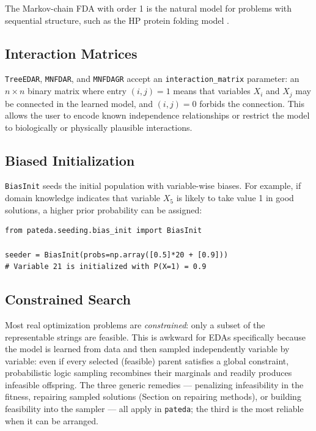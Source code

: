 \documentclass[a4paper,11pt]{article}
\begin{document}
The Markov-chain FDA with order 1 is the natural model for problems with
sequential structure, such as the HP protein folding model
\citep{Dill:1985,Santana_et_al:2004}.

\subsection{Interaction Matrices}

\texttt{TreeEDAR}, \texttt{MNFDAR}, and \texttt{MNFDAGR} accept an
\texttt{interaction\_matrix} parameter: an $n \times n$ binary matrix where
entry $(i,j)=1$ means that variables $X_i$ and $X_j$ may be connected in
the learned model, and $(i,j)=0$ forbids the connection.  This allows the
user to encode known independence relationships or restrict the model to
biologically or physically plausible interactions.

\subsection{Biased Initialization}

\texttt{BiasInit} seeds the initial population with variable-wise biases.
For example, if domain knowledge indicates that variable $X_5$ is likely to
take value 1 in good solutions, a higher prior probability can be assigned:

\begin{lstlisting}
from pateda.seeding.bias_init import BiasInit

seeder = BiasInit(probs=np.array([0.5]*20 + [0.9]))
# Variable 21 is initialized with P(X=1) = 0.9
\end{lstlisting}

\subsection{Constrained Search}

Most real optimization problems are \emph{constrained}: only a subset of the
representable strings are feasible. This is awkward for EDAs specifically because
the model is learned from data and then sampled independently variable by
variable: even if every selected (feasible) parent satisfies a global constraint,
probabilistic logic sampling recombines their marginals and readily produces
infeasible offspring. The three generic remedies --- penalizing infeasibility in
the fitness, repairing sampled solutions (Section on repairing methods), or
building feasibility into the sampler --- all apply in \texttt{pateda}; the third
is the most reliable when it can be arranged.
\end{document}
